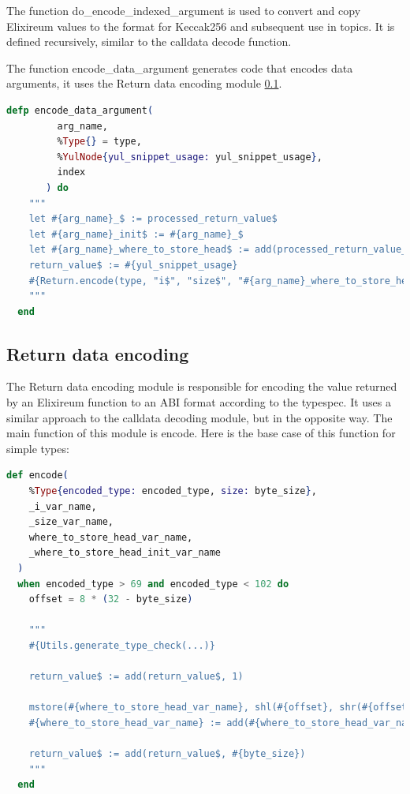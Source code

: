 The function do\_encode\_indexed\_argument is used to convert and copy Elixireum values to the format for Keccak256 and subsequent use in topics. It is defined recursively, similar to the calldata decode function.


The function encode\_data\_argument generates code that encodes data arguments, it uses the Return data encoding module \ref{ssec:return_data_encoding}. 

\begin{lstlisting}[language=elixir, caption={Encode data argument}, label={lst:encode_data_argument}]
  defp encode_data_argument(
         arg_name,
         %Type{} = type,
         %YulNode{yul_snippet_usage: yul_snippet_usage},
         index
       ) do
    """
    let #{arg_name}_$ := processed_return_value$
    let #{arg_name}_init$ := #{arg_name}_$
    let #{arg_name}_where_to_store_head$ := add(processed_return_value_init$, #{index * 32})
    return_value$ := #{yul_snippet_usage}
    #{Return.encode(type, "i$", "size$", "#{arg_name}_where_to_store_head$", "where_to_store_head_init$")}
    """
  end
\end{lstlisting}


\subsection{Return data encoding}
\label{ssec:return_data_encoding}

The Return data encoding module is responsible for encoding the value returned by an Elixireum function to an ABI format according to the typespec. It uses a similar approach to the calldata decoding module, but in the opposite way. The main function of this module is encode. Here is the base case of this function for simple types:

\begin{lstlisting}[language=elixir, caption={Encode base case}, label={lst:encode_base_case}]
  def encode(
    %Type{encoded_type: encoded_type, size: byte_size},
    _i_var_name,
    _size_var_name,
    where_to_store_head_var_name,
    _where_to_store_head_init_var_name
  )
  when encoded_type > 69 and encoded_type < 102 do
    offset = 8 * (32 - byte_size)

    """
    #{Utils.generate_type_check(...)}

    return_value$ := add(return_value$, 1)

    mstore(#{where_to_store_head_var_name}, shl(#{offset}, shr(#{offset}, mload(return_value$))))
    #{where_to_store_head_var_name} := add(#{where_to_store_head_var_name}, 32)

    return_value$ := add(return_value$, #{byte_size})
    """
  end
\end{lstlisting}

